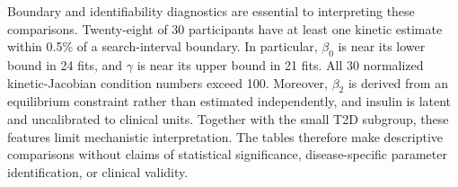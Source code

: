 


Boundary and identifiability diagnostics are essential to interpreting
these comparisons. Twenty-eight of 30 participants have at least one
kinetic estimate within 0.5\% of a search-interval boundary. In particular,
$\beta_0$ is near its lower bound in 24 fits, and $\gamma$ is near its
upper bound in 21 fits. All 30 normalized kinetic-Jacobian condition
numbers exceed 100. Moreover, $\beta_2$ is derived from an equilibrium
constraint rather than estimated independently, and insulin is latent
and uncalibrated to clinical units. Together with the small T2D subgroup,
these features limit mechanistic interpretation. The tables therefore
make descriptive comparisons without claims of statistical significance,
disease-specific parameter identification, or clinical validity.
